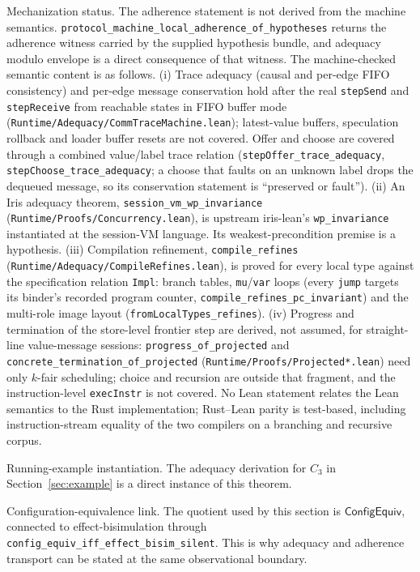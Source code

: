 \documentclass[a4paper,10pt,twocolumn,english]{article}
\numberwithin{equation}{section}
\theoremstyle{paperdef}
\theoremstyle{paperplain}
\theoremstyle{paperdef}
\theoremstyle{paperremark}
\theoremstyle{paperdef}
\newcommand{\ConfigEquiv}{\ensuremath{\mathsf{ConfigEquiv}}}
\begin{document}
Mechanization status. The adherence statement is not derived from the machine
semantics. \nolinkurl{protocol_machine_local_adherence_of_hypotheses} returns the
adherence witness carried by the supplied hypothesis bundle, and adequacy modulo
envelope is a direct consequence of that witness. The machine-checked semantic
content is as follows. (i) Trace adequacy (causal and per-edge FIFO consistency) and
per-edge message conservation hold after the real \texttt{stepSend} and
\texttt{stepReceive} from reachable states in FIFO buffer mode
(\texttt{Runtime/\allowbreak Adequacy/\allowbreak CommTraceMachine.lean}); latest-value buffers,
speculation rollback and loader buffer resets are not covered. Offer and choose
are covered through a combined value/label trace relation
(\nolinkurl{stepOffer_trace_adequacy}, \nolinkurl{stepChoose_trace_adequacy};
a choose that faults on an unknown label drops the dequeued message, so its
conservation statement is ``preserved or fault''). (ii) An Iris adequacy theorem,
\nolinkurl{session_vm_wp_invariance} (\texttt{Runtime/\allowbreak Proofs/\allowbreak Concurrency.lean}),
is upstream iris-lean's \texttt{wp\_invariance} instantiated at the session-VM
language. Its weakest-precondition premise is a hypothesis. (iii) Compilation
refinement, \nolinkurl{compile_refines}
(\texttt{Runtime/\allowbreak Adequacy/\allowbreak CompileRefines.lean}), is proved for every
local type against the specification relation \texttt{Impl}: branch tables,
\texttt{mu}/\texttt{var} loops (every \texttt{jump} targets its binder's recorded
program counter, \nolinkurl{compile_refines_pc_invariant}) and the multi-role image
layout (\nolinkurl{fromLocalTypes_refines}). (iv) Progress and termination of the
store-level frontier step are derived, not assumed, for straight-line value-message
sessions: \nolinkurl{progress_of_projected} and
\nolinkurl{concrete_termination_of_projected}
(\texttt{Runtime/\allowbreak Proofs/\allowbreak Projected*.lean}) need only $k$-fair
scheduling; choice and recursion are outside that fragment, and the
instruction-level \texttt{execInstr} is not covered. No Lean statement relates the
Lean semantics to the Rust implementation; Rust--Lean parity is test-based, including
instruction-stream equality of the two compilers on a branching and recursive corpus.

Running-example instantiation. The adequacy derivation for $C_3$ in
Section~\ref{sec:example} is a direct instance of this theorem.

Configuration-equivalence link. The quotient used by this section is
\ConfigEquiv, connected to effect-bisimulation through
\nolinkurl{config_equiv_iff_effect_bisim_silent}. This is why adequacy and
adherence transport can be stated at the same observational boundary.
\end{document}
